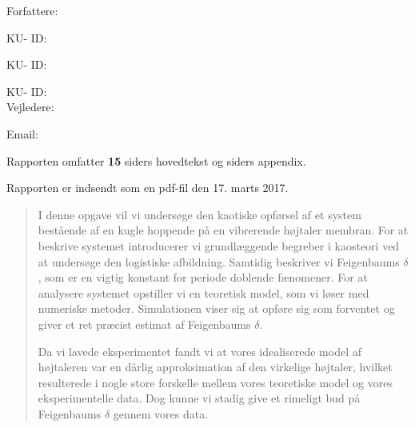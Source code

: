\documentclass[12pt,oneside,a4paper]{article}
\numberwithin{equation}{section}
\begin{document}
\vfill
{\large Forfattere:}\\
{\large \hspace*{1cm}   \hspace{1cm} KU- ID:  \\
{\large \hspace*{1cm}    \hspace{1cm} KU- ID:  \\
{\large \hspace*{1cm}    \hspace{1cm} KU- ID:  \\

{\large Vejledere:}\\
{\large \hspace*{1cm}   \hspace{1cm} Email:  \\

\vfill

{\large Rapporten omfatter {\bf 15} siders 
hovedtekst og 
{\bf 
{}} siders appendix.}

{\large Rapporten er indsendt som en pdf-fil den 17. marts 2017. }

\normalsize


\newpage
{}
\begin{abstract}
\setlength{\parindent}{0cm}
\setlength{\parskip}{0.3cm}
\noindent I denne opgave vil vi undersøge den kaotiske opførsel af et system 
bestående af en  kugle hoppende på en vibrerende højtaler membran. For at 
beskrive systemet introducerer vi grundlæggende begreber i kaosteori ved at 
undersøge den logistiske afbildning. Samtidig beskriver vi Feigenbaums 
$\delta$, som er en vigtig konstant for periode doblende fænomener. For at 
analysere systemet opstiller vi en teoretisk model, som vi løser med numeriske 
metoder. Simulationen viser sig at opføre sig som forventet og giver et ret 
præcist estimat af Feigenbaums $\delta$.

Da vi lavede eksperimentet fandt vi at vores idealiserede model af højtaleren var en dårlig approksimation af den virkelige højtaler, hvilket resulterede i nogle store forskelle mellem vores teoretiske model og vores eksperimentelle data. Dog kunne vi stadig give et rimeligt bud på Feigenbaums $\delta$ gennem vores data.



\end{abstract}}}}}
\end{document}
